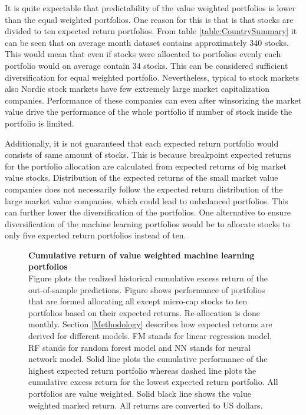 \documentclass{article}
\begin{document}
It is quite expectable that predictability of the value weighted portfolios is lower than the equal weighted portfolios. One reason for this is that is that stocks are divided to ten expected return portfolios.  From table \ref{table:CountrySummary} it can be seen that on average month dataset contains approximately 340 stocks. This would mean that even if stocks were allocated to portfolios evenly each portfolio would on average contain 34 stocks. This can be considered sufficient diversification for equal weighted portfolio. Nevertheless, typical to stock markets also Nordic stock markets have few extremely large market capitalization companies. Performance of these companies can even after winsorizing the market value drive the performance of the whole portfolio if number of stock inside the portfolio is limited. \par

Additionally, it is not guaranteed that each expected return portfolio would consists of same amount of stocks. This is because breakpoint expected returns for the portfolio allocation are calculated from expected returns of big market value stocks. Distribution of the expected returns of the small market value companies does not necessarily follow the expected return distribution of the large market value companies, which could lead to unbalanced portfolios. This can further  lower the diversification of the portfolios. One alternative to ensure diversification of the machine learning portfolios would be to allocate stocks to only five expected return portfolios instead of ten. \par

\begin{figure}[ht]
\centering
\caption[Cumulative return of value weighted machine learning portfolios]{\textbf{Cumulative return of value weighted machine learning portfolios}\\ Figure plots the realized historical cumulative excess return of the out-of-sample predictions. Figure shows performance of portfolios that are formed allocating all except micro-cap stocks to ten portfolios based on their expected returns. Re-allocation is done monthly. Section \ref{Methodology} describes how expected returns are derived for different models. FM stands for linear regression model, RF stands for random forest model and NN stands for neural network model. Solid line plots the cumulative performance of the highest expected return portfolio whereas dashed line plots the cumulative excess return for the lowest expected return portfolio. All portfolios are value weighted. Solid black line shows the value weighted marked return. All returns are converted to US dollars.}

\label{plot:cumul_vw_portf_return}
\end{figure}
\end{document}

